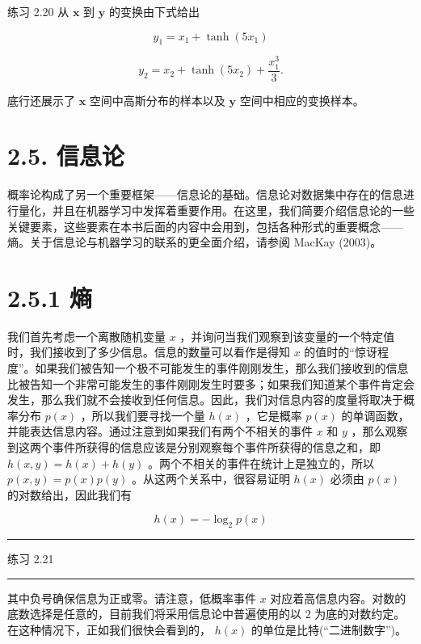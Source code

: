 \documentclass[10pt]{article}
\newcommand{\HRule}{\begin{center}\rule{0.9\linewidth}{0.2mm}\end{center}}
\begin{document}
练习 2.20 从 \(\mathbf{x}\) 到 \(\mathbf{y}\) 的变换由下式给出

\[
{y}_{1} = {x}_{1} + \tanh \left( {5{x}_{1}}\right)  \tag{2.78}
\]

\[
{y}_{2} = {x}_{2} + \tanh \left( {5{x}_{2}}\right)  + \frac{{x}_{1}^{3}}{3}. \tag{2.79}
\]

底行还展示了 \(\mathbf{x}\) 空间中高斯分布的样本以及 \(\mathbf{y}\) 空间中相应的变换样本。

\section*{2.5. 信息论}

概率论构成了另一个重要框架——信息论的基础。信息论对数据集中存在的信息进行量化，并且在机器学习中发挥着重要作用。在这里，我们简要介绍信息论的一些关键要素，这些要素在本书后面的内容中会用到，包括各种形式的重要概念——熵。关于信息论与机器学习的联系的更全面介绍，请参阅 MacKay (2003)。

\section*{2.5.1 熵}

我们首先考虑一个离散随机变量 \(x\) ，并询问当我们观察到该变量的一个特定值时，我们接收到了多少信息。信息的数量可以看作是得知 \(x\) 的值时的“惊讶程度”。如果我们被告知一个极不可能发生的事件刚刚发生，那么我们接收到的信息比被告知一个非常可能发生的事件刚刚发生时要多；如果我们知道某个事件肯定会发生，那么我们就不会接收到任何信息。因此，我们对信息内容的度量将取决于概率分布 \(p\left( x\right)\) ，所以我们要寻找一个量 \(h\left( x\right)\) ，它是概率 \(p\left( x\right)\) 的单调函数，并能表达信息内容。通过注意到如果我们有两个不相关的事件 \(x\) 和 \(y\) ，那么观察到这两个事件所获得的信息应该是分别观察每个事件所获得的信息之和，即 \(h\left( {x,y}\right)  = h\left( x\right)  + h\left( y\right)\) 。两个不相关的事件在统计上是独立的，所以 \(p\left( {x,y}\right)  = p\left( x\right) p\left( y\right)\) 。从这两个关系中，很容易证明 \(h\left( x\right)\) 必须由 \(p\left( x\right)\) 的对数给出，因此我们有

\[
h\left( x\right)  =  - {\log }_{2}p\left( x\right)  \tag{2.80}
\]

\HRule

练习 2.21

\HRule

其中负号确保信息为正或零。请注意，低概率事件 \(x\) 对应着高信息内容。对数的底数选择是任意的，目前我们将采用信息论中普遍使用的以 2 为底的对数约定。在这种情况下，正如我们很快会看到的， \(h\left( x\right)\) 的单位是比特(“二进制数字”)。
\end{document}
